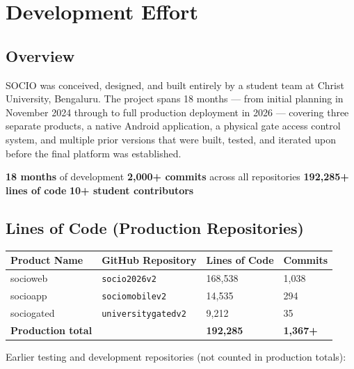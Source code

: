 \documentclass[12pt,a4paper]{article}
\begin{document}
\newpage
\section{Development Effort}

\subsection{Overview}

SOCIO was conceived, designed, and built entirely by a student team at Christ University, Bengaluru. The project spans 18 months — from initial planning in November 2024 through to full production deployment in 2026 — covering three separate products, a native Android application, a physical gate access control system, and multiple prior versions that were built, tested, and iterated upon before the final platform was established.

\begin{highlightbox}
\centering
\textbf{18 months} of development \quad\textbullet\quad \textbf{2,000+ commits} across all repositories \quad\textbullet\quad \textbf{192,285+ lines of code} \quad\textbullet\quad \textbf{10+ student contributors}
\end{highlightbox}

\subsection{Lines of Code (Production Repositories)}

\begin{tabularx}{\textwidth}{L{3cm} L{3.5cm} C{2.5cm} C{2cm}}
\toprule
{}
\textbf{Product Name} & \textbf{GitHub Repository} & \textbf{Lines of Code} & \textbf{Commits} \\
\midrule
socioweb & \texttt{socio2026v2} & 168,538 & 1,038 \\
socioapp & \texttt{sociomobilev2} & 14,535 & 294 \\
sociogated & \texttt{universitygatedv2} & 9,212 & 35 \\
\midrule
{}
\textbf{Production total} & & \textbf{192,285} & \textbf{1,367+} \\
\bottomrule
\end{tabularx}

\vspace{0.4cm}

Earlier testing and development repositories (not counted in production totals):
\end{document}
